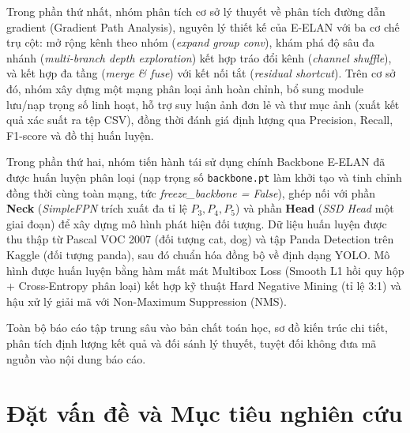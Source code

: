 \documentclass[fontsize=13pt,a4paper,oneside,DIV=calc,chapterprefix=true]{scrbook}
\begin{document}
Trong phần thứ nhất, nhóm phân tích cơ sở lý thuyết về phân tích đường dẫn gradient (Gradient Path Analysis), nguyên lý thiết kế của E-ELAN với ba cơ chế trụ cột: mở rộng kênh theo nhóm (\textit{expand group conv}), khám phá độ sâu đa nhánh (\textit{multi-branch depth exploration}) kết hợp tráo đổi kênh (\textit{channel shuffle}), và kết hợp đa tầng (\textit{merge \& fuse}) với kết nối tắt (\textit{residual shortcut}). Trên cơ sở đó, nhóm xây dựng một mạng phân loại ảnh hoàn chỉnh, bổ sung module lưu/nạp trọng số linh hoạt, hỗ trợ suy luận ảnh đơn lẻ và thư mục ảnh (xuất kết quả xác suất ra tệp CSV), đồng thời đánh giá định lượng qua Precision, Recall, F1-score và đồ thị huấn luyện.

Trong phần thứ hai, nhóm tiến hành tái sử dụng chính Backbone E-ELAN đã được huấn luyện phân loại (nạp trọng số \texttt{backbone.pt} làm khởi tạo và tinh chỉnh đồng thời cùng toàn mạng, tức \textit{freeze\_backbone = False}), ghép nối với phần \textbf{Neck} (\textit{SimpleFPN} trích xuất đa tỉ lệ $P_3, P_4, P_5$) và phần \textbf{Head} (\textit{SSD Head} một giai đoạn) để xây dựng mô hình phát hiện đối tượng. Dữ liệu huấn luyện được thu thập từ Pascal VOC 2007 (đối tượng cat, dog) và tập Panda Detection trên Kaggle (đối tượng panda), sau đó chuẩn hóa đồng bộ về định dạng YOLO. Mô hình được huấn luyện bằng hàm mất mát Multibox Loss (Smooth L1 hồi quy hộp + Cross-Entropy phân loại) kết hợp kỹ thuật Hard Negative Mining (tỉ lệ 3:1) và hậu xử lý giải mã với Non-Maximum Suppression (NMS).

Toàn bộ báo cáo tập trung sâu vào bản chất toán học, sơ đồ kiến trúc chi tiết, phân tích định lượng kết quả và đối sánh lý thuyết, tuyệt đối không đưa mã nguồn vào nội dung báo cáo.

\tableofcontents
\listoffigures
\listoftables

\mainmatter

\fancyhead{}
\fancyfoot[C]{\thepage}
\renewcommand{\headrulewidth}{0.4pt}
\renewcommand{\footrulewidth}{0.4pt}
\pagestyle{fancy}

\chapter{Đặt vấn đề và Mục tiêu nghiên cứu}
\label{chap:intro}
\end{document}

